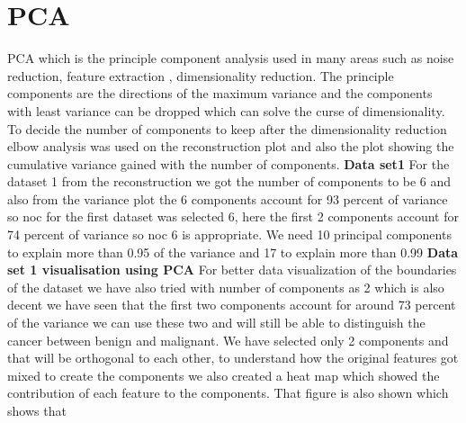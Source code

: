 \documentclass[a4paper,12pt]{article}
\begin{document}
\section {PCA} 
PCA which is the principle component analysis used in many areas such as noise reduction, feature extraction , dimensionality reduction. The principle components are the directions of the maximum variance and the components with least variance can be dropped which can solve the curse of dimensionality. To decide the number of components to keep after the dimensionality reduction  elbow analysis was used  on the reconstruction plot and also the plot showing the cumulative  variance gained with the number of components.  \newline
\textbf{ Data set1 } For the dataset 1 from the reconstruction we got the number of components to be 6 and also from the variance plot the 6 components account for 93 percent of variance so noc for the first dataset was selected 6, here the first 2 components account for 74 percent of variance so noc 6 is appropriate. We need 10 principal components to explain more than 0.95 of the variance and 17 to explain more than 0.99 \newline 
  \textbf{ Data set 1 visualisation using PCA} For better data visualization of the boundaries of the dataset we have also tried with number of components as 2 which is also decent we have seen that the first two components account for around 73 percent of the variance we can use these two and will still be able to distinguish the cancer between benign and malignant. We have selected only 2 components and that will be orthogonal to each other,  to understand how the original features got mixed to create the components we also created a heat map which showed the contribution of each feature to the components. That figure is also shown which shows that
\end{document}
